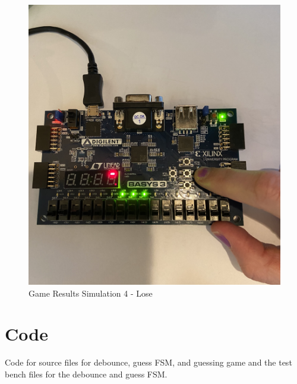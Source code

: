 \documentclass[11pt]{article}
\begin{document}
\begin{figure}[ht]\centering
	\includegraphics[angle=0, width=1.0\textwidth]{IMG_7267.jpg}
	\caption{Game Results Simulation 4 - Lose}
	\label{fig:sim_with_table}
\end{figure}
\clearpage



\section*{Code}

Code for source files for debounce, guess FSM, and guessing game and the test bench files for the debounce and guess FSM.
\end{document}
